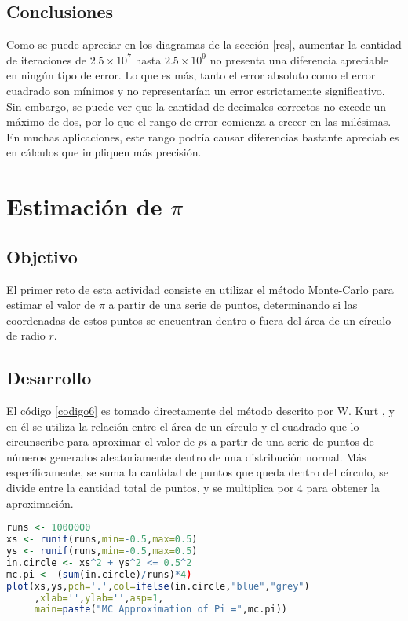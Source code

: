 \documentclass{report}
\begin{document}
\section{Conclusiones}
Como se puede apreciar en los diagramas de la secci\'on \ref{res}, aumentar la cantidad de iteraciones de $2.5\times10^7$ hasta $2.5\times10^9$ no presenta una diferencia apreciable en ning\'un tipo de error. Lo que es m\'as, tanto el error absoluto como el error cuadrado son m\'inimos y no representar\'ian un error estrictamente significativo. Sin embargo, se puede ver que la cantidad de decimales correctos no excede un m\'aximo de dos, por lo que el rango de error comienza a crecer en las mil\'esimas. En muchas aplicaciones, este rango podr\'ia causar diferencias bastante apreciables en c\'alculos que impliquen m\'as precisi\'on.

\chapter{Estimaci\'on de $\pi$}

\section{Objetivo}
El primer reto de esta actividad consiste en utilizar el m\'etodo Monte-Carlo para estimar el valor de $\pi$ a partir de una serie de puntos, determinando si las coordenadas de estos puntos se encuentran dentro o fuera del \'area de un c\'irculo de radio $r$.

\section{Desarrollo}
El c\'odigo \ref{codigo6} es tomado directamente del m\'etodo descrito por W. Kurt \cite{kurt1}, y en \'el se utiliza la relaci\'on entre el \'area de un c\'irculo y el cuadrado que lo circunscribe para aproximar el valor de $pi$ a partir de una serie de puntos de n\'umeros generados aleatoriamente dentro de una distribuci\'on normal. M\'as espec\'ificamente, se suma la cantidad de puntos que queda dentro del c\'irculo, se divide entre la cantidad total de puntos, y se multiplica por $4$ para obtener la aproximaci\'on.

\begin{lstlisting}[caption= C\'alculo de $\pi$ por M\'etodo Monte-Carlo, label=codigo6, language=R]
runs <- 1000000
xs <- runif(runs,min=-0.5,max=0.5)
ys <- runif(runs,min=-0.5,max=0.5)
in.circle <- xs^2 + ys^2 <= 0.5^2
mc.pi <- (sum(in.circle)/runs)*4)
plot(xs,ys,pch='.',col=ifelse(in.circle,"blue","grey")
     ,xlab='',ylab='',asp=1,
     main=paste("MC Approximation of Pi =",mc.pi))
\end{lstlisting}
\end{document}
